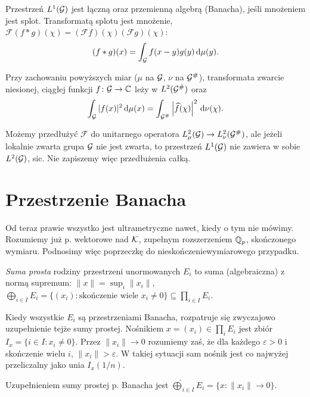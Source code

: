 \begin{fakt}
	Przestrzeń $L^1(\mathcal G)$ jest łączną oraz przemienną algebrą (Banacha), jeśli mnożeniem jest splot.
	Transformatą splotu jest mnożenie, $\mathcal F(f * g) (\chi) = (\mathcal Ff)(\chi)(\mathcal Fg)(\chi)$: \[(f * g)(x) = \int_{\mathcal G} f(x- y) g(y) \,\textrm{d}\mu(y).\]
\end{fakt}

\begin{twierdzenie}[Plancherel]
	Przy zachowaniu powyższych miar ($\mu$ na $\mathcal G$, $\nu$ na $\mathcal G^\#$), transformata zwarcie niesionej, ciągłej funkcji $f \colon \mathcal G \to \mathbb C$ leży w $L^2(\mathcal G^\#)$ oraz
	\[\int_\mathcal G |f(x)|^2 \,\textrm{d}\mu(x) = \int_{\mathcal G^\#} \left |\widehat{f}(\chi) \right|^2 \,\textrm{d} \nu(\chi).\]
\end{twierdzenie}

Możemy przedłużyć $\mathcal F$ do unitarnego operatora $L_\mu^2(\mathcal G) \to L_\nu^2(\mathcal G^\#)$, ale jeżeli lokalnie zwarta grupa $\mathcal G$ nie jest zwarta, to przestrzeń $L^1(\mathcal G)$ nie zawiera w sobie $L^2(\mathcal G)$, sic.
Nie zapiszemy więc przedłużenia całką.

\section{Przestrzenie Banacha}
Od teraz prawie wszystko jest ultrametryczne nawet, kiedy o tym nie mówimy.
Rozumiemy już p. wektorowe nad $\mathcal K$, zupełnym rozszerzeniem $\mathbb Q_p$, skończonego wymiaru.
Podnosimy więc poprzeczkę do nieskończeniewymiarowego przypadku.

\begin{definicja}
	\emph{Suma prosta}  rodziny przestrzeni unormowanych $E_i$ to suma (algebraiczna) z normą supremum: $\|x\| = \sup_i \|x_i\|$, $\bigoplus_{i \in I} E_i = \{(x_i) : \mbox{skończenie wiele } x_i \neq 0\} \subseteq \prod_{i \in I} E_i$.
\end{definicja}

Kiedy wszystkie $E_i$ są przestrzeniami Banacha, rozpatruje się zwyczajowo uzupełnienie tejże sumy prostej.
Nośnikiem $x = (x_i) \in \prod_i E_i$ jest zbiór $I_x = \{i \in I : x_i \neq 0\}$.
Przez $\|x_i\| \to 0$ rozumiemy zaś, że dla każdego $\varepsilon > 0$ i skończenie wielu $i$, $\|x_i\| > \varepsilon$.
W takiej sytuacji sam nośnik jest co najwyżej przeliczalny jako unia $I_x(1/n)$.

\begin{fakt}
	Uzupełnieniem sumy prostej p. Banacha jest $\widehat{\bigoplus}_{i \in I} E_i = \{x : \|x_i\| \to 0\}$.
\end{fakt}

